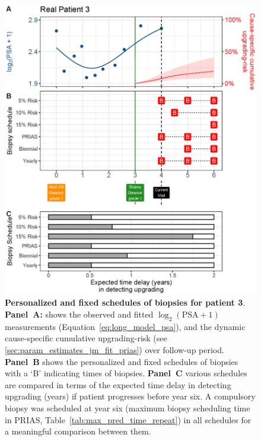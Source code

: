 \begin{figure}
\centerline{\includegraphics[width=\columnwidth]{images/demo_pat3_supp.eps}}
\caption{\textbf{Personalized and fixed schedules of biopsies for patient 3}. \textbf{Panel~A:} shows the observed and fitted $\log_2(\mbox{PSA} + 1)$ measurements (Equation~\ref{eq:long_model_psa}), and the dynamic cause-specific cumulative upgrading-risk (see \ref{sec:param_estimates_jm_fit_prias}) over follow-up period. \textbf{Panel~B} shows the personalized and fixed schedules of biopsies with a `B' indicating times of biopsies. \textbf{Panel~C} various schedules are compared in terms of the expected time delay in detecting upgrading (years) if patient progresses before year six. A compulsory biopsy was scheduled at year six (maximum biopsy scheduling time in PRIAS, Table~\ref{tab:max_pred_time_repeat}) in all schedules for a meaningful comparison between them.}
\label{fig:demo_pat3_supp}
\end{figure}